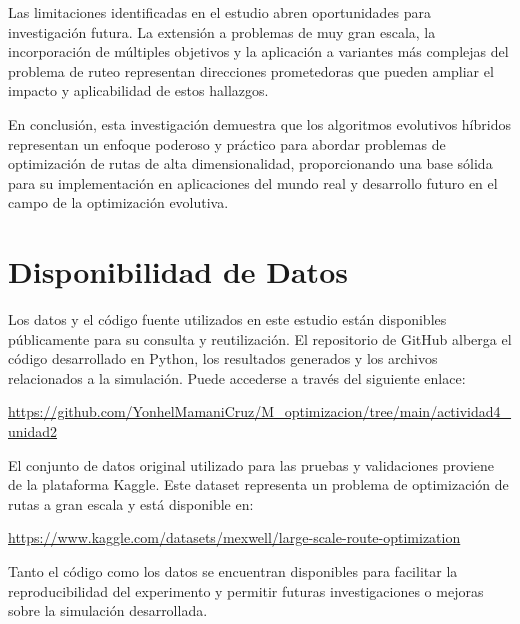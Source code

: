 \documentclass[conference]{IEEEtran}
\begin{document}
Las limitaciones identificadas en el estudio abren oportunidades para investigación futura. La extensión a problemas de muy gran escala, la incorporación de múltiples objetivos y la aplicación a variantes más complejas del problema de ruteo representan direcciones prometedoras que pueden ampliar el impacto y aplicabilidad de estos hallazgos.

En conclusión, esta investigación demuestra que los algoritmos evolutivos híbridos representan un enfoque poderoso y práctico para abordar problemas de optimización de rutas de alta dimensionalidad, proporcionando una base sólida para su implementación en aplicaciones del mundo real y desarrollo futuro en el campo de la optimización evolutiva.



\section{Disponibilidad de Datos}

Los datos y el código fuente utilizados en este estudio están disponibles públicamente para su consulta y reutilización. El repositorio de GitHub alberga el código desarrollado en Python, los resultados generados y los archivos relacionados a la simulación. Puede accederse a través del siguiente enlace:

\url{https://github.com/YonhelMamaniCruz/M_optimizacion/tree/main/actividad4_unidad2}

El conjunto de datos original utilizado para las pruebas y validaciones proviene de la plataforma Kaggle. Este dataset representa un problema de optimización de rutas a gran escala y está disponible en:

\url{https://www.kaggle.com/datasets/mexwell/large-scale-route-optimization}

Tanto el código como los datos se encuentran disponibles para facilitar la reproducibilidad del experimento y permitir futuras investigaciones o mejoras sobre la simulación desarrollada.
\end{document}

